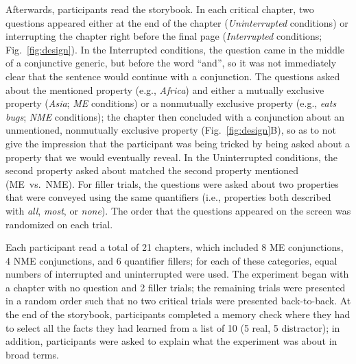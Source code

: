 \documentclass[10pt,letterpaper]{article}
\newcommand{\red}[1]{{\textcolor{Red}{#1}}}
\begin{document}
Afterwards, participants read the storybook.
In each critical chapter, two questions appeared either at the end of the chapter (\emph{Uninterrupted} conditions) or interrupting the chapter right before the final page  (\emph{Interrupted} conditions; Fig.~\ref{fig:design}).
In the Interrupted conditions, the question came in the middle of a conjunctive generic, but before the word ``and'', so it was not immediately clear that the sentence would continue with a conjunction.
The questions asked about the mentioned property (e.g., \emph{Africa}) and either a mutually exclusive property (\emph{Asia}; \emph{ME} conditions) or a nonmutually exclusive property (e.g., \emph{eats bugs}; \emph{NME} conditions); the chapter then concluded with a conjunction about an unmentioned, nonmutually exclusive property (Fig.~\ref{fig:design}B), so as to not give the impression that the participant was being tricked by being asked about a property that we would eventually reveal.
In the Uninterrupted conditions,  the second property asked about matched the second property mentioned (ME~vs.~NME). 
For filler trials, the questions were asked about two properties that were conveyed using the same quantifiers (i.e., properties both described with \emph{all}, \emph{most}, or \emph{none}).
The order that the questions appeared on the screen was randomized on each trial.

Each participant read a total of 21 chapters, which included 8 ME conjunctions, 4 NME conjunctions, and 6 quantifier fillers; for each of these categories, equal numbers of interrupted and uninterrupted were used. 
The experiment began with a chapter with no question and 2 filler trials; the remaining trials were presented in a random order such that no two critical trials were presented back-to-back. 
At the end of the storybook, participants completed a memory check where they had to select all the facts they had learned from a list of 10 (5 real, 5 distractor); in addition, participants were asked to explain what the experiment was about in broad terms.

\end{document}
